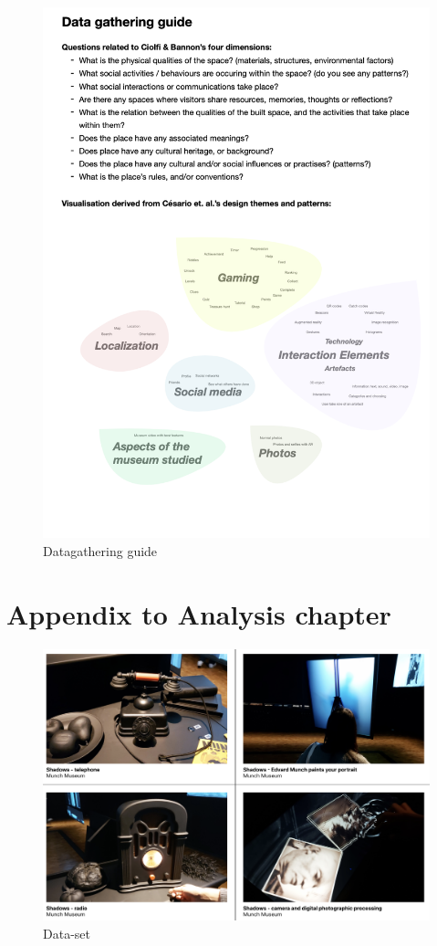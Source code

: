 \begin{figure}[H]
    \centering 
    \includegraphics[width=13cm]{pictures/appendix/datagathering.png}
    \caption{Datagathering guide}
\end{figure}

\section{Appendix to Analysis chapter}

\begin{figure}[H]
    \centering
    \includegraphics[width=13cm]{pictures/dataset/munch_1.png}
    \caption{Data-set}
\end{figure}

